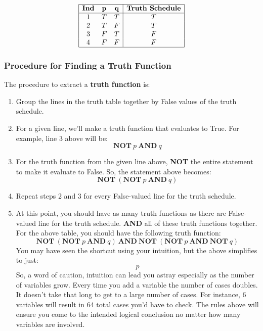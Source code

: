 \documentclass{article}
\begin{document}
\begin{displaymath}
    \begin{array}{|c c c|c|}
    \hline
    \textbf{Ind} & \textbf{p} & \textbf{q} & \textbf{Truth Schedule}\\
    \hline
    1 & T & T & T\\
    2 & T & F & T\\
    3 & F & T & F\\
    4 & F & F & F\\
    \hline
    \end{array}
\end{displaymath}

\subsubsection{Procedure for Finding a Truth Function}
The procedure to extract a \textbf{truth function} is:
\begin{enumerate}
\item Group the lines in the truth table together by False values of the truth schedule.
\item For a given line, we'll make a truth function that evaluates to True. For example, line 3 above will be:
\begin{displaymath}
    \textbf{NOT}\:p\:\textbf{AND}\:q
\end{displaymath}
\item For the truth function from the given line above, \textbf{NOT} the entire statement to make it evaluate to False. So, the statement above becomes:
\begin{displaymath}
    \textbf{NOT}\:(\textbf{NOT}\:p\:\textbf{AND}\:q)
\end{displaymath}
\item Repeat steps 2 and 3 for every False-valued line for the truth schedule.
\item At this point, you should have as many truth functions as there are False-valued line for the truth schedule. \textbf{AND} all of these truth functions together. For the above table, you should have the following truth function:
\begin{displaymath}
\textbf{NOT}\:(\textbf{NOT}\:p\:\textbf{AND}\:q)\:\textbf{AND}\:\textbf{NOT}\:(\textbf{NOT}\:p\:\textbf{AND}\:\textbf{NOT}\:q)
\end{displaymath}
You may have seen the shortcut using your intuition, but the above simplifies to just:
\begin{displaymath}
p
\end{displaymath}
So, a word of caution, intuition can lead you astray especially as the number of variables grow. Every time you add a variable the number of cases doubles. It doesn't take that long to get to a large number of cases. For instance, 6 variables will result in 64 total cases you'd have to check. The rules above will ensure you come to the intended logical conclusion no matter how many variables are involved.
\end{enumerate}
\end{document}
